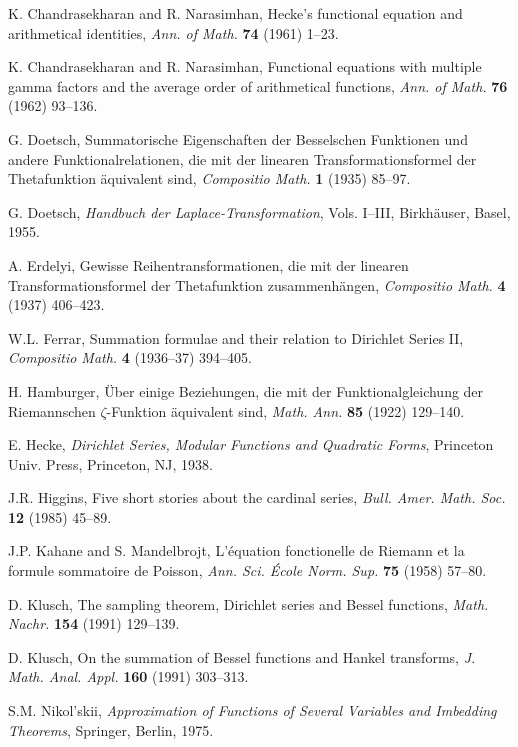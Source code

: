 \documentclass[11pt]{article}
\theoremstyle{plain}
\begin{document}
\begin{thebibliography}{99}
K. Chandrasekharan and R. Narasimhan, Hecke's functional equation and arithmetical identities, \textit{Ann. of Math.} \textbf{74} (1961) 1--23.

K. Chandrasekharan and R. Narasimhan, Functional equations with multiple gamma factors and the average order of arithmetical functions, \textit{Ann. of Math.} \textbf{76} (1962) 93--136.

G. Doetsch, Summatorische Eigenschaften der Besselschen Funktionen und andere Funktionalrelationen, die mit der linearen Transformationsformel der Thetafunktion äquivalent sind, \textit{Compositio Math.} \textbf{1} (1935) 85--97.

G. Doetsch, \textit{Handbuch der Laplace-Transformation}, Vols. I--III, Birkhäuser, Basel, 1955.

A. Erdelyi, Gewisse Reihentransformationen, die mit der linearen Transformationsformel der Thetafunktion zusammenhängen, \textit{Compositio Math.} \textbf{4} (1937) 406--423.

W.L. Ferrar, Summation formulae and their relation to Dirichlet Series II, \textit{Compositio Math.} \textbf{4} (1936--37) 394--405.

H. Hamburger, Über einige Beziehungen, die mit der Funktionalgleichung der Riemannschen $\zeta$-Funktion äquivalent sind, \textit{Math. Ann.} \textbf{85} (1922) 129--140.

E. Hecke, \textit{Dirichlet Series, Modular Functions and Quadratic Forms}, Princeton Univ. Press, Princeton, NJ, 1938.

J.R. Higgins, Five short stories about the cardinal series, \textit{Bull. Amer. Math. Soc.} \textbf{12} (1985) 45--89.

J.P. Kahane and S. Mandelbrojt, L'équation fonctionelle de Riemann et la formule sommatoire de Poisson, \textit{Ann. Sci. École Norm. Sup.} \textbf{75} (1958) 57--80.

D. Klusch, The sampling theorem, Dirichlet series and Bessel functions, \textit{Math. Nachr.} \textbf{154} (1991) 129--139.

D. Klusch, On the summation of Bessel functions and Hankel transforms, \textit{J. Math. Anal. Appl.} \textbf{160} (1991) 303--313.

S.M. Nikol'skii, \textit{Approximation of Functions of Several Variables and Imbedding Theorems}, Springer, Berlin, 1975.


\end{thebibliography}
\end{document}

